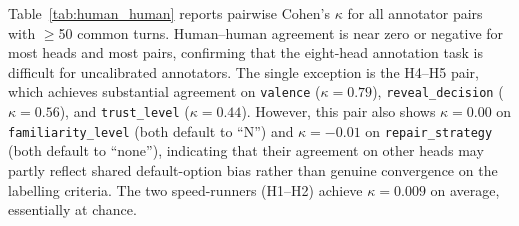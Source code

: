 \documentclass[11pt]{article}
\begin{document}
Table~\ref{tab:human_human} reports pairwise Cohen's $\kappa$ for all annotator pairs with $\geq$50 common turns.
Human--human agreement is near zero or negative for most heads and most pairs, confirming that the eight-head annotation task is difficult for uncalibrated annotators.
The single exception is the H4--H5 pair, which achieves substantial agreement on \texttt{valence} ($\kappa{=}0.79$), \texttt{reveal\_decision} ($\kappa{=}0.56$), and \texttt{trust\_level} ($\kappa{=}0.44$).
However, this pair also shows $\kappa{=}0.00$ on \texttt{familiarity\_level} (both default to ``N'') and $\kappa{=}-0.01$ on \texttt{repair\_strategy} (both default to ``none''), indicating that their agreement on other heads may partly reflect shared default-option bias rather than genuine convergence on the labelling criteria.
The two speed-runners (H1--H2) achieve $\kappa{=}0.009$ on average, essentially at chance.

\begin{table}[h]
\centering
\caption{Pairwise human--human Cohen's $\kappa$ for annotator pairs with $\geq$50 common turns. H1--H4 share 150 turns; pairs involving H5 share 82. Pairs are ordered by mean $\kappa$ (descending).}
\label{tab:human_human}
\small
{}
\end{table}
\end{document}
